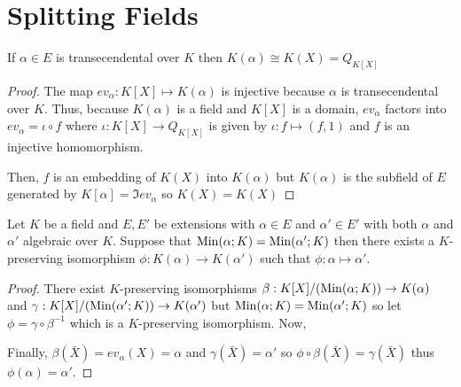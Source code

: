\documentclass[12pt]{extarticle}
\begin{document}
\section{Splitting Fields}
\begin{lemma}
If $\alpha \in E$ is transecendental over $K$ then $K(\alpha) \cong K(X) = Q_{K[X]}$
\end{lemma}
\begin{proof}
The map $ev_\alpha : K[X] \mapsto K(\alpha)$ is injective because $\alpha$ is transecendental over $K$. Thus, because $K(\alpha)$ is a field and $K[X]$ is a domain, $ev_\alpha$ factors into $ev_\alpha = \iota \circ f$ where $\iota : K[X] \to Q_{K[X]}$ is given by $\iota : f \mapsto (f,1)$ and $f$ is an injective homomorphism. 
\begin{center}
\end{center}

Then, $f$ is an embedding of $K(X)$ into $K(\alpha)$ but $K(\alpha)$ is the subfield of $E$ generated by $K[\alpha] = \Im{ev_\alpha}$ so $K(X) = K(X)$ 
\end{proof}

\begin{theorem}[Embedding]
Let $K$ be a field and $E, E'$ be extensions with $\alpha \in E$ and $\alpha' \in E'$ with both $\alpha$ and $\alpha'$ algebraic over $K$. Suppose that $\mathrm{Min}(\alpha;K) = \mathrm{Min}(\alpha';K)$ then there exists a $K$-preserving isomorphism $\phi : K(\alpha) \to K(\alpha')$ such that $\phi : \alpha \mapsto \alpha'$. 
\end{theorem}

\begin{proof}
There exist $K$-preserving isomorphisms $\beta : K[X]/(\mathrm{Min}(\alpha;K)) \to K(\alpha)$ and $\gamma : K[X]/(\mathrm{Min}(\alpha';K)) \to K(\alpha')$ but $\mathrm{Min}(\alpha;K) = \mathrm{Min}(\alpha';K)$ so let $\phi = \gamma \circ \beta^{-1}$ which is a $K$-preserving isomorphism. Now, 
\begin{center}
\end{center}
Finally, $\beta(\bar{X}) = ev_\alpha(X) = \alpha$ and $\gamma(\bar{X}) = \alpha'$ so $\phi \circ \beta(\bar{X}) = \gamma(\bar{X})$ thus $\phi(\alpha) = \alpha'$.  
\end{proof}
\end{document}
